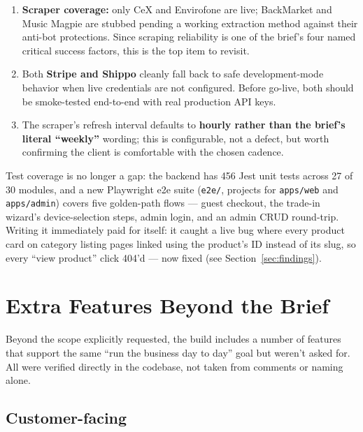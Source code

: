 \documentclass[11pt,a4paper]{article}
\begin{document}
\begin{enumerate}[leftmargin=1.4em, itemsep=5pt, topsep=4pt]
  \item \textbf{Scraper coverage:} only CeX and Envirofone are live; BackMarket and Music Magpie are stubbed pending a working extraction method against their anti-bot protections. Since scraping reliability is one of the brief's four named critical success factors, this is the top item to revisit.
  \item Both \textbf{Stripe and Shippo} cleanly fall back to safe development-mode behavior when live credentials are not configured. Before go-live, both should be smoke-tested end-to-end with real production API keys.
  \item The scraper's refresh interval defaults to \textbf{hourly rather than the brief's literal ``weekly''} wording; this is configurable, not a defect, but worth confirming the client is comfortable with the chosen cadence.
\end{enumerate}

Test coverage is no longer a gap: the backend has 456 Jest unit tests across 27 of 30 modules, and a new Playwright e2e suite (\texttt{e2e/}, projects for \texttt{apps/web} and \texttt{apps/admin}) covers five golden-path flows --- guest checkout, the trade-in wizard's device-selection steps, admin login, and an admin CRUD round-trip. Writing it immediately paid for itself: it caught a live bug where every product card on category listing pages linked using the product's ID instead of its slug, so every ``view product'' click 404'd --- now fixed (see Section~\ref{sec:findings}).

\section{Extra Features Beyond the Brief}
\label{sec:extras}

Beyond the scope explicitly requested, the build includes a number of features that support the same ``run the business day to day'' goal but weren't asked for. All were verified directly in the codebase, not taken from comments or naming alone.

\subsection{Customer-facing}
\end{document}
